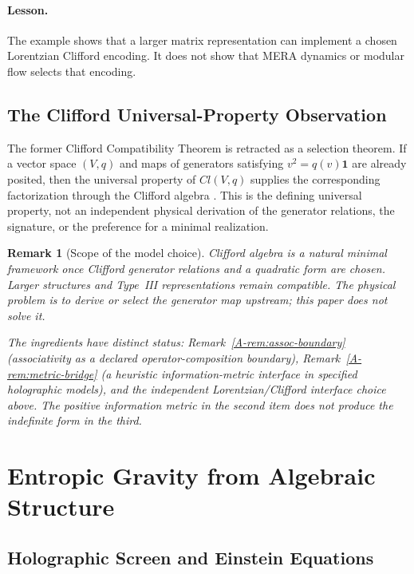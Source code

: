 \documentclass[12pt,a4paper,openany]{book}
\newtheorem{remark}[theorem]{Remark}
\begin{document}
\paragraph{Lesson.}
The example shows that a larger matrix representation can implement a chosen Lorentzian Clifford encoding.  It does not show that MERA dynamics or modular flow selects that encoding.

\subsection{The Clifford Universal-Property Observation}

The former Clifford Compatibility Theorem is retracted as a selection theorem.  If a vector space $(V,q)$ and maps of generators satisfying $v^2=q(v)\mathbf1$ are already posited, then the universal property of $Cl(V,q)$ supplies the corresponding factorization through the Clifford algebra \cite{Hestenes1966,Doran2003}.  This is the defining universal property, not an independent physical derivation of the generator relations, the signature, or the preference for a minimal realization.

\begin{remark}[Scope of the model choice]
\label{A-rem:scope}
Clifford algebra is a natural minimal framework once Clifford generator relations and a quadratic form are chosen.  Larger structures and Type~III representations remain compatible.  The physical problem is to derive or select the generator map upstream; this paper does not solve it.

The ingredients have distinct status:
Remark~\ref{A-rem:assoc-boundary} (associativity as a declared operator-composition boundary),
Remark~\ref{A-rem:metric-bridge} (a heuristic information-metric interface in specified holographic models),
and the independent Lorentzian/Clifford interface choice above.  The positive information metric in the second item does not produce the indefinite form in the third.
\end{remark}

\section{Entropic Gravity from Algebraic Structure}
\label{A-sec:entropic}

\subsection{Holographic Screen and Einstein Equations}
\end{document}
